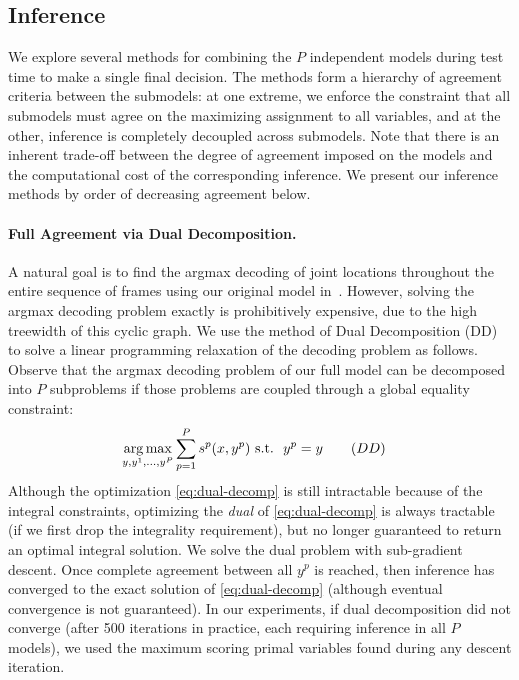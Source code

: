 \subsection{Inference}\label{sec:stretchable-inference}
We explore several methods for combining the $P$ independent models
during test time to make a single final decision.  The methods form a
hierarchy of agreement criteria between the submodels: at one extreme,
we enforce the constraint that all submodels must agree on the
maximizing assignment to all variables, and at the other, inference is
completely decoupled across submodels. Note that there is an inherent
trade-off between the degree of agreement imposed on the models and the
computational cost of the corresponding inference.  We present our
inference methods by order of decreasing agreement below.

\paragraph{Full Agreement via Dual Decomposition.} A natural goal is
to find the argmax decoding of joint locations throughout the entire
sequence of frames using our original model in~.  However, 
solving the argmax decoding problem
exactly is prohibitively expensive, due to the high treewidth of this
cyclic graph. We use the method of Dual Decomposition (DD)
\citep{bertsekas99,komodakis2007} to solve a linear
programming relaxation of the decoding problem as follows. Observe
that the argmax decoding problem of our full model can be decomposed
into $P$ subproblems { if those problems are coupled through a global
  equality constraint}:
\begin{align}
  \label{eq:dual-decomp}
&\mathop{\arg\max}_{y, y^1,\dots,y^P} \sum_{p=1}^P s^p(x,y^p)  \textrm{ s.t. } \:  y^p=y  \quad{}\quad{(DD)}
\end{align}
Although the optimization \eqref{eq:dual-decomp} is still intractable because of the integral constraints, optimizing the {\em dual} of \eqref{eq:dual-decomp} is always
tractable (if we first drop the integrality requirement), but no longer guaranteed to return an optimal integral solution. We solve the dual problem with sub-gradient descent. Once complete agreement between all
$y^p$ is reached, then inference has converged to the exact solution
of \eqref{eq:dual-decomp} (although eventual convergence is not
guaranteed). In our experiments, if dual decomposition did not
converge (after 500 iterations in practice, each requiring inference in all $P$ models), we used the maximum scoring primal variables found during
any descent iteration.


